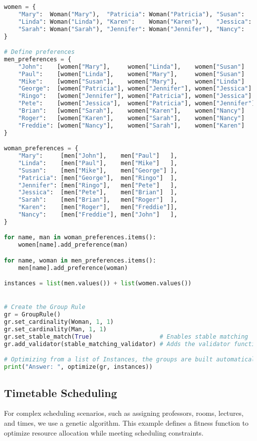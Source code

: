 \begin{lstlisting}[language=Python, caption={Creating and solving the Stable Marriage Problem using this framework.}, label={script:stable_marriage}]
women = {
    "Mary":  Woman("Mary"),  "Patricia": Woman("Patricia"), "Susan":   Woman("Susan"),
    "Linda": Woman("Linda"), "Karen":    Woman("Karen"),    "Jessica": Woman("Jessica"),
    "Sarah": Woman("Sarah"), "Jennifer": Woman("Jennifer"), "Nancy":   Woman("Nancy")
}

# Define preferences
men_preferences = {
    "John":    [women["Mary"],     women["Linda"],    women["Susan"]   ],
    "Paul":    [women["Linda"],    women["Mary"],     women["Susan"]   ],
    "Mike":    [women["Susan"],    women["Mary"],     women["Linda"]   ],
    "George":  [women["Patricia"], women["Jennifer"], women["Jessica"] ],
    "Ringo":   [women["Jennifer"], women["Patricia"], women["Jessica"] ],
    "Pete":    [women["Jessica"],  women["Patricia"], women["Jennifer"]],
    "Brian":   [women["Sarah"],    women["Karen"],    women["Nancy"]   ],
    "Roger":   [women["Karen"],    women["Sarah"],    women["Nancy"]   ],
    "Freddie": [women["Nancy"],    women["Sarah"],    women["Karen"]   ],
}

woman_preferences = {
    "Mary":     [men["John"],    men["Paul"]   ],
    "Linda":    [men["Paul"],    men["Mike"]   ],
    "Susan":    [men["Mike"],    men["George"] ],
    "Patricia": [men["George"],  men["Ringo"]  ],
    "Jennifer": [men["Ringo"],   men["Pete"]   ],
    "Jessica":  [men["Pete"],    men["Brian"]  ],
    "Sarah":    [men["Brian"],   men["Roger"]  ],
    "Karen":    [men["Roger"],   men["Freddie"]],
    "Nancy":    [men["Freddie"], men["John"]   ],
}

for name, man in woman_preferences.items():
    women[name].add_preference(man)

for name, woman in men_preferences.items():
    men[name].add_preference(woman)

instances = list(men.values()) + list(women.values())


# Create the Group Rule
gr = GroupRule()
gr.set_cardinality(Woman, 1, 1)
gr.set_cardinality(Man, 1, 1)
gr.set_stable_match(True)                   # Enables stable matching
gr.add_validator(stable_matching_validator) # Adds the validator function

# Optimizing from a list of Instances, the groups are built automatically.
print("Answer: ", optimize(gr, instances))
\end{lstlisting}

\subsection{Timetable Scheduling}
For complex scheduling scenarios, such as assigning professors, rooms, lectures, and times, we use a genetic algorithm. This example defines a fitness function to optimize resource allocation while meeting scheduling constraints. 

